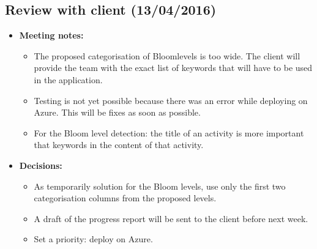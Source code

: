 \documentclass[a4paper,12pt]{article}
\begin{document}
\subsection{Review with client (13/04/2016)}
\begin{itemize}
\item \textbf{Meeting notes:} 
\begin{itemize}
\item The proposed categorisation of Bloomlevels is too wide. The client will provide the team with the exact list of keywords that will have to be used in the application.
\item Testing is not yet possible because there was an error while deploying on Azure. This will be fixes as soon as possible.
\item For the Bloom level detection: the title of an activity is more important that keywords in the content of that activity.
\end{itemize}
\item \textbf{Decisions:} 
\begin{itemize}
\item As temporarily solution for the Bloom levels, use only the first two categorisation columns from the proposed levels.
\item A draft of the progress report will be sent to the client before next week.
\item Set a priority: deploy on Azure.
\end{itemize}
\end{itemize}
\end{document}
